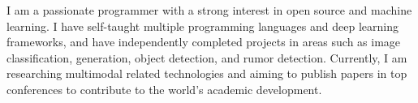 

\begin{cvparagraph}

\quad \quad I am a passionate programmer with a strong interest in open source and machine learning. I have self-taught multiple programming languages and deep learning frameworks, and have independently completed projects in areas such as image classification, generation, object detection, and rumor detection. Currently, I am researching multimodal related technologies and aiming to publish papers in top conferences to contribute to the world's academic development.
\end{cvparagraph}
